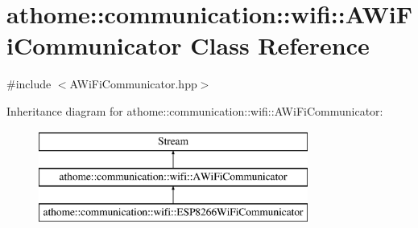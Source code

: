 \hypertarget{classathome_1_1communication_1_1wifi_1_1_a_wi_fi_communicator}{}\section{athome\+:\+:communication\+:\+:wifi\+:\+:A\+Wi\+Fi\+Communicator Class Reference}
\label{classathome_1_1communication_1_1wifi_1_1_a_wi_fi_communicator}


{\ttfamily \#include $<$A\+Wi\+Fi\+Communicator.\+hpp$>$}

Inheritance diagram for athome\+:\+:communication\+:\+:wifi\+:\+:A\+Wi\+Fi\+Communicator\+:\begin{figure}[H]
\begin{center}
\leavevmode
\includegraphics[height=3.000000cm]{classathome_1_1communication_1_1wifi_1_1_a_wi_fi_communicator}
\end{center}
\end{figure}
